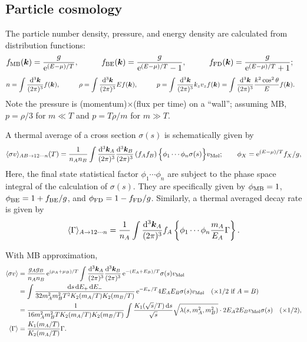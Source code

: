 \documentclass[CheatSheet]{subfiles}
\newcommand{\ddP}[2][3]{\frac{\dd^{#1}\vc#2}{(2\pi)^{#1}}}
\begin{document}
\subsection{Particle cosmology}
The particle number density, pressure, and energy density are calculated from distribution functions:
\begin{alignat}{3}
 f_{\mathrm{MB}}({\boldsymbol{k}})&=\frac{g}{\mathop{}\!\mathrm{e}^{(E-\mu)/T}},\qquad&
 f_{\mathrm{BE}}({\boldsymbol{k}})&=\frac{g}{\mathop{}\!\mathrm{e}^{(E-\mu)/T}-1},\qquad&
 f_{\mathrm{FD}}({\boldsymbol{k}})&=\frac{g}{\mathop{}\!\mathrm{e}^{(E-\mu)/T}+1};
\end{alignat}
\begin{alignat}{3}
 n   &=\int\ddP{k}f(\vc k),\qquad&
 \rho&=\int\ddP{k}Ef(\vc k),\qquad&
 p   &=\int\ddP{k}k_zv_z f(\vc k)
      =\int\ddP{k}\frac{k^2\cos^2\theta}{E} f(\vc k).
\end{alignat}
Note the pressure is (momentum)$\times$(flux per time) on a ``wall''; assuming MB, $p=\rho/3$ for $m\ll T$ and $p=T\rho/m$ for $m\gg T$.

A thermal average of a cross section $\sigma(s)$ is schematically given by
\begin{equation}
 \vev{\sigma v}_{AB\to12\cdots n}(T)
=\frac{1}{n_An_B}\int\ddP{k_A}\ddP{k_B}\left(
f_A f_B\right)\Bigl\{\phi_1 \cdots \phi_n\sigma(s)\Bigr\}
v_{\text{M\o l}};\qquad \phi_X = \ee^{(E-\mu)/T}f_X/g,
\end{equation}
Here, the final state statistical factor $\phi_1\cdots\phi_n$ are subject to the phase space integral of the calculation of $\sigma(s)$. They are specifically given by $\phi_{\mathrm{MB}}=1$, $\phi_{\mathrm{BE}}=1+f_{\mathrm{BE}}/g$, and $\phi_{\mathrm{FD}}=1-f_{\mathrm{FD}}/g$.
Similarly, a thermal averaged decay rate is given by
\begin{equation}
 \vev{\Gamma}_{A\to12\cdots n}
=\frac{1}{n_A}\int\ddP{k_A}
f_A \left\{\phi_1 \cdots \phi_n
\frac{m_A}{E_A}\Gamma\right\}.
\end{equation}


With MB approximation,
\begin{align}
 \vev{\sigma v}
&=
\frac{g_Ag_B}{n_An_B}
\ee^{(\mu_A+\mu_B)/T}
\int\ddP{k_A}\ddP{k_B}
\ee^{-(E_A+E_B)/T}
\sigma(s)v_{\text{M\o l}}
\\
&=
\int\frac{\dd s\dd E_+ \dd E_-}{32m_A^2 m_B^2 T^2 K_2(m_A/T)K_2(m_B/T)}
\ee^{-E_+/T}
4E_AE_B\sigma(s)v_{\text{M\o l}}\quad(\text{$\times1/2$ if $A=B$)}
\\
&=
\frac{1}{16m_A^2 m_B^2 T K_2(m_A/T)K_2(m_B/T)}
\int
\frac{K_1(\sqrt{s}/T) \dd s}{\sqrt{s}}
\sqrt{\Kallen(s,m_A^2,m_B^2)}
\cdot2E_A2E_Bv_{\text{M\o l}}\sigma(s)
\quad(\times1/2),
\\
 \vev{\Gamma}
 &=\frac{K_1(m_A/T)}{K_2(m_A/T)}\Gamma.
\end{align}
\end{document}
